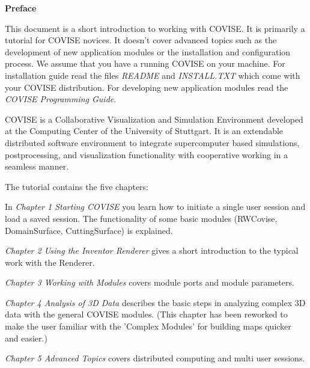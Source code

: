 
\begin{htmlonly}

\end{htmlonly}


\startdocument
\label{Preface}

\begin{Huge}{\bf Preface}\end{Huge}
\vspace{0.5cm}

This document is a short introduction to working with COVISE. It is primarily a 
tutorial for COVISE novices. It doesn't cover advanced topics such as the 
development of new application modules or the installation and configuration 
process. We assume that you have a running COVISE on your machine. For installation 
guide read the files {\it README} and {\it INSTALL.TXT} which come with your 
COVISE distribution. For developing new application modules read the 
{\it COVISE Programming Guide}.

\vspace{0.5cm}
COVISE is a Collaborative Visualization and Simulation Environment developed 
at the Computing Center of the University of Stuttgart. It is an
extendable distributed software environment to integrate supercomputer based 
simulations, postprocessing, and visualization functionality with
cooperative working in a seamless manner.

\vspace{0.5cm}
The tutorial contains the five chapters:

In {\it Chapter 1 Starting COVISE} you learn how to initiate a single user 
session and load a saved session. The functionality of some basic modules
(RWCovise, DomainSurface, CuttingSurface) is explained. 

{\it Chapter 2 Using the Inventor Renderer} gives a short introduction to the 
typical work with the Renderer. 

{\it Chapter 3 Working with Modules} covers module ports and module parameters. 

{\it Chapter 4 Analysis of 3D Data} describes the basic steps in analyzing
complex 3D data with the general COVISE modules. (This chapter has been 
reworked to make the user familiar with the 'Complex Modules'  
for building maps quicker and easier.) 

{\it Chapter 5 Advanced Topics} covers distributed computing and multi user 
sessions. 

